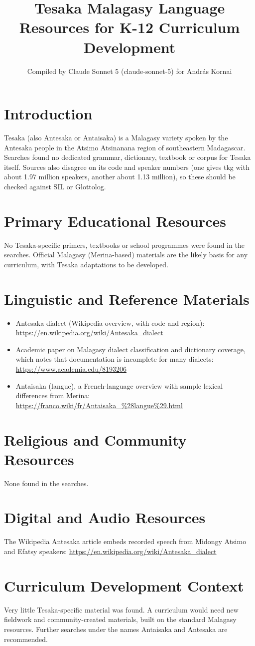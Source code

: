 \documentclass[12pt]{article}
\title{Tesaka Malagasy Language Resources for K-12 Curriculum Development}
\author{Compiled by Claude Sonnet 5 (claude-sonnet-5) for Andr\'as Kornai}
\date{}
\begin{document}
\maketitle

\section{Introduction}
Tesaka (also Antesaka or Antaisaka) is a Malagasy variety spoken by the Antesaka people in the Atsimo Atsinanana region of southeastern Madagascar. Searches found no dedicated grammar, dictionary, textbook or corpus for Tesaka itself. Sources also disagree on its code and speaker numbers (one gives tkg with about 1.97 million speakers, another about 1.13 million), so these should be checked against SIL or Glottolog.

\section{Primary Educational Resources}
No Tesaka-specific primers, textbooks or school programmes were found in the searches. Official Malagasy (Merina-based) materials are the likely basis for any curriculum, with Tesaka adaptations to be developed.

\section{Linguistic and Reference Materials}
\begin{itemize}
\item Antesaka dialect (Wikipedia overview, with code and region): \url{https://en.wikipedia.org/wiki/Antesaka_dialect}
\item Academic paper on Malagasy dialect classification and dictionary coverage, which notes that documentation is incomplete for many dialects: \url{https://www.academia.edu/8193206}
\item Antaisaka (langue), a French-language overview with sample lexical differences from Merina: \url{https://franco.wiki/fr/Antaisaka_%28langue%29.html}
\end{itemize}

\section{Religious and Community Resources}
None found in the searches.

\section{Digital and Audio Resources}
The Wikipedia Antesaka article embeds recorded speech from Midongy Atsimo and Efatsy speakers: \url{https://en.wikipedia.org/wiki/Antesaka_dialect}

\section{Curriculum Development Context}
Very little Tesaka-specific material was found. A curriculum would need new fieldwork and community-created materials, built on the standard Malagasy resources. Further searches under the names Antaisaka and Antesaka are recommended.
\end{document}
